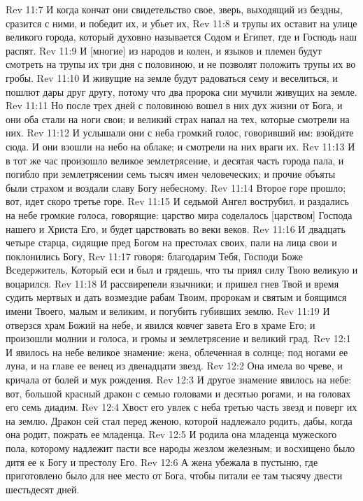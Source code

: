Rev 11:7  И когда кончат они свидетельство свое, зверь, выходящий из бездны, сразится с ними, и победит их, и убьет их,
Rev 11:8  и трупы их оставит на улице великого города, который духовно называется Содом и Египет, где и Господь наш распят.
Rev 11:9  И [многие] из народов и колен, и языков и племен будут смотреть на трупы их три дня с половиною, и не позволят положить трупы их во гробы.
Rev 11:10  И живущие на земле будут радоваться сему и веселиться, и пошлют дары друг другу, потому что два пророка сии мучили живущих на земле.
Rev 11:11  Но после трех дней с половиною вошел в них дух жизни от Бога, и они оба стали на ноги свои; и великий страх напал на тех, которые смотрели на них.
Rev 11:12  И услышали они с неба громкий голос, говоривший им: взойдите сюда. И они взошли на небо на облаке; и смотрели на них враги их.
Rev 11:13  И в тот же час произошло великое землетрясение, и десятая часть города пала, и погибло при землетрясении семь тысяч имен человеческих; и прочие объяты были страхом и воздали славу Богу небесному.
Rev 11:14  Второе горе прошло; вот, идет скоро третье горе.
Rev 11:15  И седьмой Ангел вострубил, и раздались на небе громкие голоса, говорящие: царство мира соделалось [царством] Господа нашего и Христа Его, и будет царствовать во веки веков.
Rev 11:16  И двадцать четыре старца, сидящие пред Богом на престолах своих, пали на лица свои и поклонились Богу,
Rev 11:17  говоря: благодарим Тебя, Господи Боже Вседержитель, Который еси и был и грядешь, что ты приял силу Твою великую и воцарился.
Rev 11:18  И рассвирепели язычники; и пришел гнев Твой и время судить мертвых и дать возмездие рабам Твоим, пророкам и святым и боящимся имени Твоего, малым и великим, и погубить губивших землю.
Rev 11:19  И отверзся храм Божий на небе, и явился ковчег завета Его в храме Его; и произошли молнии и голоса, и громы и землетрясение и великий град.
Rev 12:1  И явилось на небе великое знамение: жена, облеченная в солнце; под ногами ее луна, и на главе ее венец из двенадцати звезд.
Rev 12:2  Она имела во чреве, и кричала от болей и мук рождения.
Rev 12:3  И другое знамение явилось на небе: вот, большой красный дракон с семью головами и десятью рогами, и на головах его семь диадим.
Rev 12:4  Хвост его увлек с неба третью часть звезд и поверг их на землю. Дракон сей стал перед женою, которой надлежало родить, дабы, когда она родит, пожрать ее младенца.
Rev 12:5  И родила она младенца мужеского пола, которому надлежит пасти все народы жезлом железным; и восхищено было дитя ее к Богу и престолу Его.
Rev 12:6  А жена убежала в пустыню, где приготовлено было для нее место от Бога, чтобы питали ее там тысячу двести шестьдесят дней.
